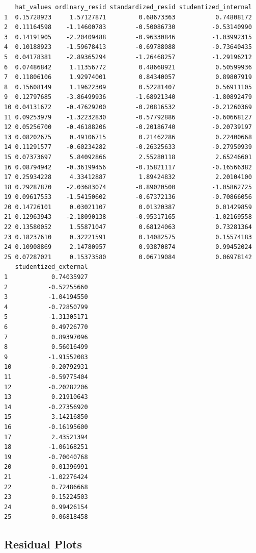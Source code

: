 \documentclass[
  letterpaper,
]{scrbook}
\begin{document}
\begin{verbatim}
   hat_values ordinary_resid standardized_resid studentized_internal
1  0.15728923     1.57127871         0.68673363           0.74808172
2  0.11164598    -1.14600783        -0.50086730          -0.53140990
3  0.14191905    -2.20409488        -0.96330846          -1.03992315
4  0.10188923    -1.59678413        -0.69788088          -0.73640435
5  0.04178381    -2.89365294        -1.26468257          -1.29196212
6  0.07486842     1.11356772         0.48668921           0.50599936
7  0.11806106     1.92974001         0.84340057           0.89807919
8  0.15608149     1.19622309         0.52281407           0.56911105
9  0.12797685    -3.86499936        -1.68921340          -1.80892479
10 0.04131672    -0.47629200        -0.20816532          -0.21260369
11 0.09253979    -1.32232830        -0.57792886          -0.60668127
12 0.05256700    -0.46188206        -0.20186740          -0.20739197
13 0.08202675     0.49106715         0.21462286           0.22400668
14 0.11291577    -0.60234282        -0.26325633          -0.27950939
15 0.07373697     5.84092866         2.55280118           2.65246601
16 0.08794942    -0.36199456        -0.15821117          -0.16566382
17 0.25934228     4.33412887         1.89424832           2.20104100
18 0.29287870    -2.03683074        -0.89020500          -1.05862725
19 0.09617553    -1.54150602        -0.67372136          -0.70866056
20 0.14726101     0.03021107         0.01320387           0.01429859
21 0.12963943    -2.18090138        -0.95317165          -1.02169558
22 0.13580052     1.55871047         0.68124063           0.73281364
23 0.18237610     0.32221591         0.14082575           0.15574183
24 0.10908869     2.14780957         0.93870874           0.99452024
25 0.07287021     0.15373580         0.06719084           0.06978142
   studentized_external
1            0.74035927
2           -0.52255660
3           -1.04194550
4           -0.72850799
5           -1.31305171
6            0.49726770
7            0.89397096
8            0.56016499
9           -1.91552083
10          -0.20792931
11          -0.59775404
12          -0.20282206
13           0.21910643
14          -0.27356920
15           3.14216850
16          -0.16195600
17           2.43521394
18          -1.06168251
19          -0.70040768
20           0.01396991
21          -1.02276424
22           0.72486668
23           0.15224503
24           0.99426154
25           0.06818458
\end{verbatim}

\subsection{Residual Plots}\label{residual-plots}
\end{document}
